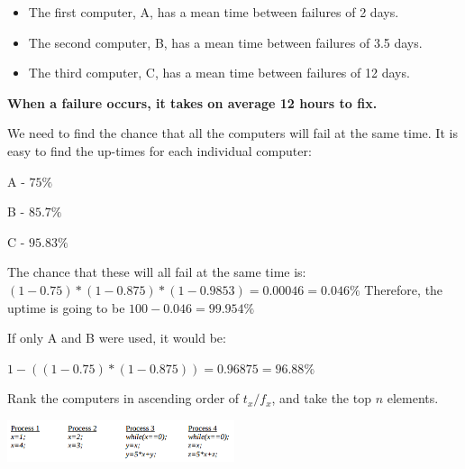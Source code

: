 
\begin{itemize}
\item The first computer, A, has a mean time between failures of 2 days.
\item The second computer, B, has a mean time between failures of 3.5 days.
\item The third computer, C, has a mean time between failures of 12 days.
\end{itemize}

\textbf{When a failure occurs, it takes on average 12 hours to fix.}


We need to find the chance that all the computers will fail at the same time.
It is easy to find the up-times for each individual computer:

\begin{description}
  \item A - $75\%$
  \item B - $85.7\%$
  \item C - $95.83\%$
\end{description}

The chance that these will all fail at the same time is:
$(1 - 0.75) * (1 - 0.875) * (1 - 0.9853) = 0.00046 = 0.046\%$
Therefore, the uptime is going to be $100 - 0.046 = 99.954\%$


If only A and B were used, it would be:

$1 - ((1 - 0.75) * (1 - 0.875)) = 0.96875 = 96.88\%$


Rank the computers in ascending order of $t_x/f_x$, and take the top $n$
elements.


\begin{center}
  \includegraphics[width=0.5\textwidth]{images/2011-2-d}
\end{center}

